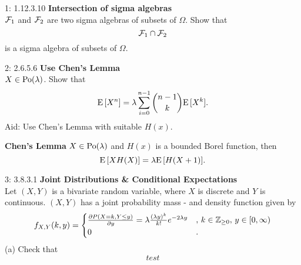 \documentclass[a4paper,twoside=false,abstract=false,numbers=noenddot,
titlepage=false,headings=small,parskip=half,version=last]{scrartcl}
\begin{document}

\begin{exercise}{1: 1.12.3.10} {\bf Intersection of sigma algebras}   \\
    $\mathcal{F}_1$ and $\mathcal{F}_2$ are two sigma algebras of subsets of $\Omega$. Show
    that
    \begin{equation*}
        \mathcal{F}_1 \cap \mathcal{F}_2
    \end{equation*}
    is a sigma algebra of subsets of $\Omega$.
\end{exercise}
\begin{solution}
\end{solution}
\pagebreak

\begin{exercise}{2: 2.6.5.6} {\bf Use Chen's Lemma} \\
    $X \in \text{Po}(\lambda)$. Show that
    \begin{equation}
        {\rm E}\,[X^n] =
        \lambda \sum\limits_{i=0}^{n-1} \binom{n-1}{k}{\rm E}\,[X^k].
    \end{equation}
    Aid: Use Chen's Lemma with suitable $H(x)$.
\end{exercise}
\begin{solution}
    \begin{lemma}
        \label{lemma:chen}  %
        {\bf Chen's Lemma} $X \in \text{Po}(\lambda)$ and $H(x)$ is a bounded
        Borel function, then
        \begin{equation*}
            {\rm E}\,[XH(X)] = \lambda{\rm E}\,[H(X+1)].
        \end{equation*}
    \end{lemma}
\end{solution}
\pagebreak

\begin{exercise}{3: 3.8.3.1}
    {\bf Joint Distributions \& Conditional Expectations } \\
    Let $(X, Y)$ is a bivariate random variable, where $X$ is discrete and $Y$
    is continuous. $(X, Y)$ has a joint probability mass - and density function
    given by
    \begin{equation*}
        f_{X,Y}(k, y) = \begin{cases}
            \frac{\partial{P(X=k, Y\le y)}}{\partial{y}} =
                \lambda\frac{(\lambda y)^k}{k!}e^{-2\lambda y}
                    &,\, k\in\mathbb{Z}_{\ge 0},\, y\in [0, \infty) \\
            0       &.
        \end{cases}
    \end{equation*}
    (a) Check that
    \begin{equation*}
        test
    \end{equation*}
\end{exercise}
\begin{solution}
\end{solution}
\pagebreak
\end{document}
